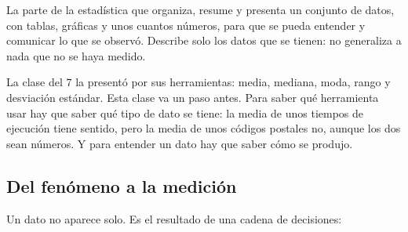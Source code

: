 \documentclass[11pt,letterpaper]{article}
\begin{document}
\begin{definicion}
    La parte de la estadística que organiza, resume y presenta un
    conjunto de datos, con tablas, gráficas y unos cuantos números,
    para que se pueda entender y comunicar lo que se observó. Describe
    solo los datos que se tienen: no generaliza a nada que no se haya
    medido.
\end{definicion}

La clase del $7$ la presentó por sus herramientas: media, mediana,
moda, rango y desviación estándar. Esta clase va un paso antes. Para
saber qué herramienta usar hay que saber qué tipo de dato se tiene: la
media de unos tiempos de ejecución tiene sentido, pero la media de unos
códigos postales no, aunque los dos sean números. Y para entender un
dato hay que saber cómo se produjo.


\subsection*{Del fenómeno a la medición}

Un dato no aparece solo. Es el resultado de una cadena de decisiones:

\begin{center}
\end{center}
\end{document}
